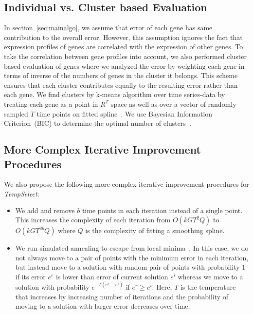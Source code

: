 \documentclass[10pt]{article}
\newcommand{\Tempselect}{\textit{TempSelect}\xspace}
\begin{document}
\subsection{Individual vs. Cluster based Evaluation}\label{sec:clusteval}

In section~\ref{sec:mainalgo}, we assume that error of each gene has
same contribution to the overall error. However, this assumption
ignores the fact that expression profiles of genes are correlated with the expression of other genes. To take the
correlation between gene profiles into account, we also performed cluster
based evaluation of genes where we analyzed the error by weighting each gene in terms of inverse of the numbers of
genes in the cluster it belongs. This scheme ensures that each cluster
contributes equally to the resulting error rather than each gene. We
find clusters by k-means algorithm over time series-data by treating each gene as a
point in $R^{T}$ space as well as over a vector of
randomly sampled $T$ time points on fitted spline~\cite{bishop2006}. We use Bayesian Information Criterion~(BIC) to
determine the optimal number of clusters~\cite{bic}.

\subsection{More Complex Iterative Improvement Procedures}\label{sec:complexiter}

We also propose the following more complex iterative improvement procedures for \Tempselect:

\begin{itemize}
\item We add and remove $b$ time points in each iteration instead of a single point. This increases the complexity of each
  iteration from $O(kGT^{2}Q)$ to $O(kGT^{2b}Q)$ where $Q$ is
  the complexity of fitting a smoothing spline.

\item We run simulated annealing to escape from local
  minima~\cite{kirkpatrick1983}. In this case, we do not always move
  to a pair of points with the minimum error in each iteration, but
  instead move to a solution with random pair of points with probability $1$ if
  its error $e^{r}$ is lower than error of current solution $e^{i}$ whereas we move to a solution with probability
  $e^{-T(e^{r}-e^{i})}$ if $e^{r} \ge e^{i}$. Here, $T$ is the temperature that increases by
  increasing number of iterations and the probability of moving to a solution
  with larger error decreases over time.
\end{itemize}
\end{document}
